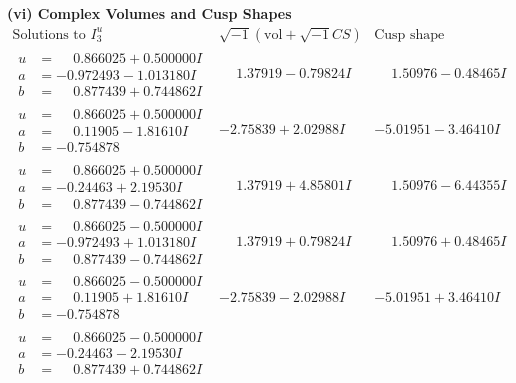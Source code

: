 \documentclass[1p]{elsarticle_modified}
\theoremstyle{definition}
\newcommand{\I}{\sqrt{-1}}
\begin{document}
\newpage\flushleft \textbf{(vi) Complex Volumes and Cusp Shapes}
$$\begin{array}{c|c|c}  
\text{Solutions to }I^u_{3}& \I (\text{vol} + \sqrt{-1}CS) & \text{Cusp shape}\\
 \hline 
\begin{aligned}
u &= \phantom{-}0.866025 + 0.500000 I \\
a &= -0.972493 - 1.013180 I \\
b &= \phantom{-}0.877439 + 0.744862 I\end{aligned}
 & \phantom{-}1.37919 - 0.79824 I & \phantom{-}1.50976 - 0.48465 I \\ \hline\begin{aligned}
u &= \phantom{-}0.866025 + 0.500000 I \\
a &= \phantom{-}0.11905 - 1.81610 I \\
b &= -0.754878\phantom{ +0.000000I}\end{aligned}
 & -2.75839 + 2.02988 I & -5.01951 - 3.46410 I \\ \hline\begin{aligned}
u &= \phantom{-}0.866025 + 0.500000 I \\
a &= -0.24463 + 2.19530 I \\
b &= \phantom{-}0.877439 - 0.744862 I\end{aligned}
 & \phantom{-}1.37919 + 4.85801 I & \phantom{-}1.50976 - 6.44355 I \\ \hline\begin{aligned}
u &= \phantom{-}0.866025 - 0.500000 I \\
a &= -0.972493 + 1.013180 I \\
b &= \phantom{-}0.877439 - 0.744862 I\end{aligned}
 & \phantom{-}1.37919 + 0.79824 I & \phantom{-}1.50976 + 0.48465 I \\ \hline\begin{aligned}
u &= \phantom{-}0.866025 - 0.500000 I \\
a &= \phantom{-}0.11905 + 1.81610 I \\
b &= -0.754878\phantom{ +0.000000I}\end{aligned}
 & -2.75839 - 2.02988 I & -5.01951 + 3.46410 I \\ \hline\begin{aligned}
u &= \phantom{-}0.866025 - 0.500000 I \\
a &= -0.24463 - 2.19530 I \\
b &= \phantom{-}0.877439 + 0.744862 I\end{aligned}

\end{array}$$
\end{document}

